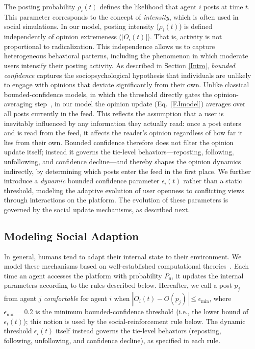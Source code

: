 \documentclass[pdflatex,sn-mathphys-num]{sn-jnl}%
\theoremstyle{thmstyleone}%
\theoremstyle{thmstyletwo}%
\theoremstyle{thmstylethree}%
\def\post{\rho} %
\def\BoundedConfidence{\epsilon}
\begin{document}
The posting probability $\post_i(t)$ defines the likelihood
that agent $i$ posts at time $t$. This parameter corresponds to the
concept of \emph{intensity}, which is often used in social simulations.
In our model, posting intensity ($\post_i(t)$) is
defined independently of opinion extremeness ($|O_i(t)|$). That is,
activity is not proportional to radicalization. This independence
allows us to capture heterogeneous behavioral patterns, including
the phenomenon in which moderate users intensify their posting activity. As described in Section \ref{Intro}, \emph{bounded confidence} captures the sociopsychological hypothesis that
individuals are unlikely to engage with opinions that
deviate significantly from their own. Unlike classical bounded-confidence
models, in which the threshold directly gates the opinion-averaging
step~\cite{Deffuant2000,Hegselmann2002}, in our model the opinion update
(Eq.~\eqref{FJmodel}) averages over all posts currently in the feed. This
reflects the assumption that a user is inevitably influenced by any information
they actually read: once a post enters and is read from the feed, it affects the
reader's opinion regardless of how far it lies from their own. Bounded confidence
therefore does not filter the opinion update itself; instead it governs the
tie-level behaviors---reposting, following, unfollowing, and confidence
decline---and thereby shapes the opinion dynamics indirectly, by determining
which posts enter the feed in the first place. We further
introduce a \emph{dynamic} bounded confidence parameter $\BoundedConfidence_i(t)$
rather than a static threshold, modeling the adaptive evolution of user
openness to conflicting views through interactions on the platform.
The evolution of these parameters is
governed by the social update mechanisms, as described next.
\par



\subsection{Modeling Social Adaption} 
In general, humans tend to adapt their internal state to their environment. We model these mechanisms based on well-established computational theories~\cite{Friedkin1990,Deffuant2000,Hegselmann2002,Sasahara2021}. Each
time an agent accesses the platform with probability $P_a$, it updates
the internal parameters according to the rules described below. 
Hereafter, we call a post $p_j$ from agent $j$ \emph{comfortable} for agent $i$
when $|O_i(t) - O(p_j)| \leq \epsilon_{\min}$, where $\epsilon_{\min} = 0.2$ is the
minimum bounded-confidence threshold (i.e., the lower bound of $\BoundedConfidence_i(t)$);
this notion is used by the social-reinforcement rule below. The dynamic threshold
$\BoundedConfidence_i(t)$ itself instead governs the tie-level behaviors
(reposting, following, unfollowing, and confidence decline), as specified in each rule.
\par
\end{document}
